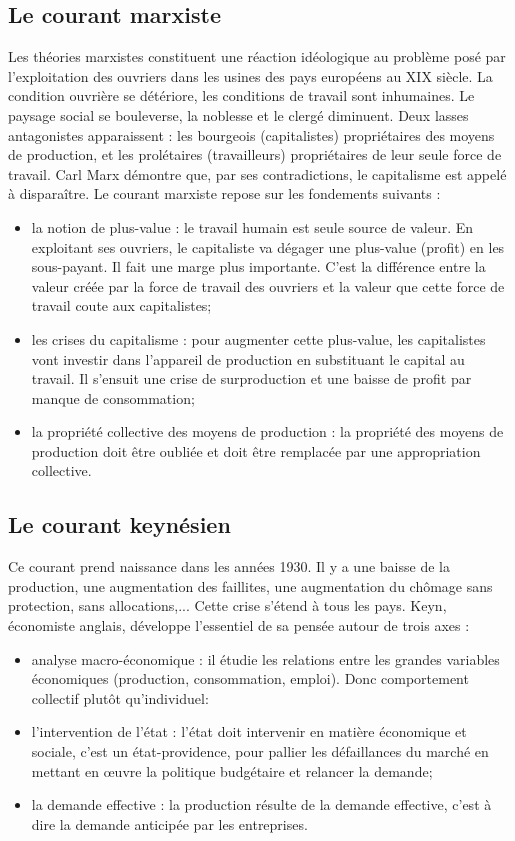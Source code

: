 \documentclass[11pt]{article}
\begin{document}
		\subsection{Le courant marxiste}
			Les théories marxistes constituent une réaction idéologique au problème posé par l'exploitation des ouvriers dans les usines des pays européens au XIX siècle. La condition ouvrière se détériore, les conditions de travail sont inhumaines. Le paysage social se bouleverse, la noblesse et le clergé diminuent. Deux lasses antagonistes apparaissent : les bourgeois (capitalistes) propriétaires des moyens de production, et les prolétaires (travailleurs) propriétaires de leur seule force de travail. Carl Marx démontre que, par ses contradictions, le capitalisme est appelé à disparaître. Le courant marxiste repose sur les fondements suivants :
			\begin{itemize}
				\item la notion de plus-value : le travail humain est seule source de valeur. En exploitant ses ouvriers, le capitaliste va dégager une plus-value (profit) en les sous-payant. Il fait une marge plus importante. C'est la différence entre la valeur créée par la force de travail des ouvriers et la valeur que cette force de travail coute aux capitalistes;
				\item les crises du capitalisme : pour augmenter cette plus-value, les capitalistes vont investir dans l'appareil de production en substituant le capital au travail. Il s'ensuit une crise de surproduction et une baisse de profit par manque de consommation;
				\item la propriété collective des moyens de production : la propriété des moyens de production doit être oubliée et doit être remplacée par une appropriation collective.
			\end{itemize}
			
		\subsection{Le courant keynésien}
			Ce courant prend naissance dans les années 1930. Il y a une baisse de la production, une augmentation des faillites, une augmentation du chômage sans protection, sans allocations,... Cette crise s'étend à tous les pays. Keyn, économiste anglais, développe l'essentiel de sa pensée autour de trois axes :
			\begin{itemize}
				\item analyse macro-économique : il étudie les relations entre les grandes variables économiques (production, consommation, emploi). Donc comportement collectif plutôt qu'individuel:
				\item l'intervention de l'état : l'état doit intervenir en matière économique et sociale, c'est un état-providence, pour pallier les défaillances du marché en mettant en œuvre la politique budgétaire et relancer la demande;
				\item la demande effective : la production résulte de la demande effective, c'est à dire la demande anticipée par les entreprises.
			\end{itemize}
			
\end{document}
